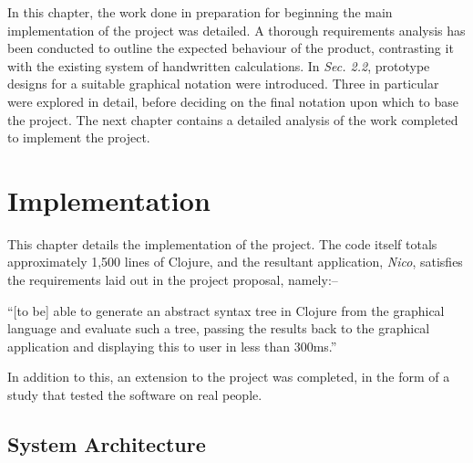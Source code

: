 \documentclass[12pt,twoside,notitlepage,xetex]{report}
\begin{document}
In this chapter, the work done in preparation for beginning the main
implementation of the project was detailed.  A thorough requirements analysis
has been conducted to outline the expected behaviour of the product,
contrasting it with the existing system of handwritten calculations.  In
\emph{Sec. 2.2}, prototype designs for a suitable graphical notation were
introduced.  Three in particular were explored in detail, before deciding on
the final notation upon which to base the project.  The next chapter contains a
detailed analysis of the work completed to implement the project.

\cleardoublepage
\chapter{Implementation}

This chapter details the implementation of the project.  The code itself totals
approximately 1,500 lines of Clojure, and the resultant application,
\emph{Nico}, satisfies the requirements laid out in the project proposal,
namely:--
\begin{center}
\parbox[c]{\textwidth-2cm}{
\small
``[to be] able to generate an abstract syntax tree in Clojure from the graphical language and evaluate such a tree, passing the results back to the graphical application and displaying this to user in less than 300ms.''
}
\end{center}
In addition to this, an extension to the project was completed, in the form of
a study that tested the software on real people.

\section{System Architecture}
\end{document}

